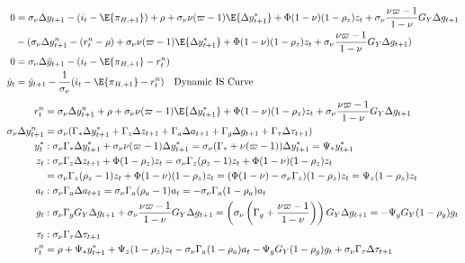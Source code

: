 \begin{align}
    0 &= \sigma_\nu \Delta y_{t+1} - (i_t - \E \{ \pi_{H,+1}\}) + \rho + \sigma_\nu \nu (\varpi - 1)\E \{\Delta y_{t+1}^* \}  + \Phi(1-\nu) (1-\rho_z)z_t + \sigma_\nu \frac{\nu \varpi  - 1}{1-\nu} G_Y \Delta g_{t+1} \\
    & - (\sigma_\nu \Delta y^n_{t+1} - (r^n_t - \rho) + \sigma_\nu \nu (\varpi - 1)\E \{\Delta y_{t+1}^* \}  + \Phi (1-\nu)(1-\rho_z)z_t + \sigma_\nu \frac{\nu \varpi  - 1}{1-\nu} G_Y \Delta g_{t+1})\\
    0 &= \sigma_\nu \Delta \tilde{y}_{t+1} - (i_t - \E \{ \pi_{H,+1}\} - r^n_t)\\
    \tilde{y}_t &= \tilde{y}_{t+1} - \frac{1}{\sigma_\nu}(i_t - \E \{ \pi_{H,+1}\} - r^n_t) \quad \text{Dynamic IS Curve}\\
\end{align}
\pagebreak
\begin{align}
    r^n_t  &= \sigma_\nu \Delta y^n_{t+1} + \rho + \sigma_\nu \nu (\varpi - 1)\E \{\Delta y_{t+1}^* \}  + \Phi (1-\nu)(1-\rho_z)z_t + \sigma_\nu \frac{\nu \varpi  - 1}{1-\nu} G_Y \Delta g_{t+1}\\
    \sigma_\nu \Delta y^n_{t+1} &= \sigma_\nu(\Gamma_* \Delta y^*_{t+1} + \Gamma_z \Delta z_{t+1} + \Gamma_a \Delta a_{t+1} + \Gamma_g \Delta g_{t+1} + \Gamma_\tau \Delta \tau_{t+1})\\
    y^*_t&: \sigma_\nu \Gamma_* \Delta y^*_{t+1} + \sigma_\nu \nu(\varpi-1)\Delta y^*_{t+1} = \sigma_\nu(\Gamma_* + \nu(\varpi-1))\Delta y^*_{t+1} = \Psi_* y^*_{t+1}\\
    z_t&: \sigma_\nu \Gamma_z \Delta z_{t+1} + \Phi (1-\rho_z)z_t = \sigma_\nu \Gamma_z (\rho_z - 1)z_t + \Phi (1-\nu)(1-\rho_z)z_t\\
    &= \sigma_\nu \Gamma_z (\rho_z - 1)z_t + \Phi (1-\nu)(1-\rho_z)z_t = (\Phi (1-\nu) - \sigma_\nu \Gamma_z)(1-\rho_z)z_t = \Psi_z (1-\rho_z) z_t\\
    a_t&: \sigma_\nu \Gamma_a \Delta a_{t+1} = \sigma_\nu \Gamma_a (\rho_a - 1)a_t = - \sigma_\nu \Gamma_a (1 - \rho_a)a_t\\
    g_t&: \sigma_\nu \Gamma_g G_Y \Delta g_{t+1} + \sigma_\nu \frac{\nu \varpi  - 1}{1-\nu} G_Y \Delta g_{t+1} = \left( \sigma_\nu \left(\Gamma_g + \frac{\nu \varpi  - 1}{1-\nu} \right) \right)G_Y \Delta g_{t+1} = -\Psi_g G_Y (1-\rho_g)g_t \\
    \tau_t&: \sigma_\nu \Gamma_\tau \Delta \tau_{t+1}\\
    r^n_t  &= \rho + \Psi_* y^*_{t+1} + \Psi_z (1-\rho_z) z_t - \sigma_\nu \Gamma_a (1 - \rho_a)a_t -\Psi_g G_Y (1-\rho_g)g_t + \sigma_\nu \Gamma_\tau \Delta \tau_{t+1}
\end{align}